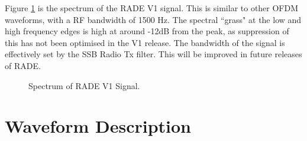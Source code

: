 \documentclass{article}
\begin{document}
Figure \ref{fig:rade_psd} is the spectrum of the RADE V1 signal. This is similar to other OFDM waveforms, with a RF bandwidth of 1500 Hz. The spectral ``grass" at the low and high frequency edges is high at around -12dB from the peak, as suppression of this has not been optimised in the V1 release.  The bandwidth of the signal is effectively set by the SSB Radio Tx filter.  This will be improved in future releases of RADE.
  
\begin{figure}[h]
\caption{Spectrum of RADE V1 Signal.}
\label{fig:rade_psd}
\begin{center}

\end{center}
\end{figure}

\section{Waveform Description}
\end{document}

